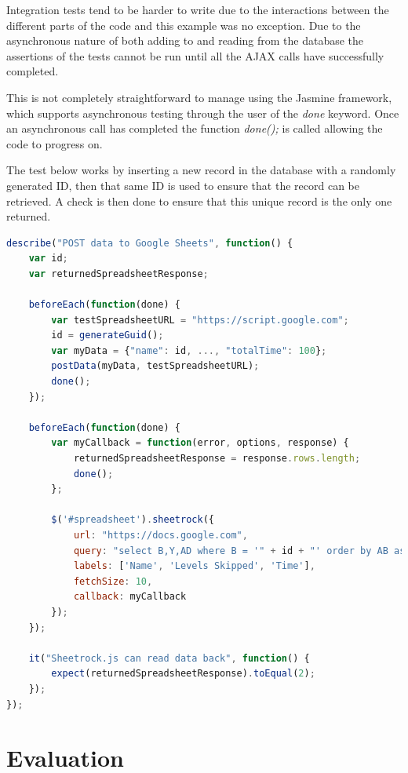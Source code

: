 \documentclass[12pt,a4paper]{report}
\begin{document}
Integration tests tend to be harder to write due to the interactions between the different parts of the code and this example was no exception. Due to the asynchronous nature of both adding to and reading from the database the assertions of the tests cannot be run until all the AJAX calls have successfully completed. 

This is not completely straightforward to manage using the Jasmine framework, which supports asynchronous testing through the user of the \textit{done} keyword. Once an asynchronous call has completed the function \textit{done();} is called allowing the code to progress on. 

The test below works by inserting a new record in the database with a randomly generated ID, then that same ID is used to ensure that the record can be retrieved. A check is then done to ensure that this unique record is the only one returned. 

\begin{minipage}{\linewidth}
\begin{lstlisting}[language=JavaScript]
describe("POST data to Google Sheets", function() {
    var id;
    var returnedSpreadsheetResponse;

    beforeEach(function(done) {
        var testSpreadsheetURL = "https://script.google.com";
        id = generateGuid();
        var myData = {"name": id, ..., "totalTime": 100};
        postData(myData, testSpreadsheetURL);
        done();
    });

    beforeEach(function(done) {
        var myCallback = function(error, options, response) {
            returnedSpreadsheetResponse = response.rows.length;
            done();
        };

        $('#spreadsheet').sheetrock({
            url: "https://docs.google.com",
            query: "select B,Y,AD where B = '" + id + "' order by AB asc",
            labels: ['Name', 'Levels Skipped', 'Time'],
            fetchSize: 10,
            callback: myCallback
        });
    });

    it("Sheetrock.js can read data back", function() {
        expect(returnedSpreadsheetResponse).toEqual(2);
    });
});
\end{lstlisting}
\end{minipage}

\chapter{Evaluation}
\end{document}

